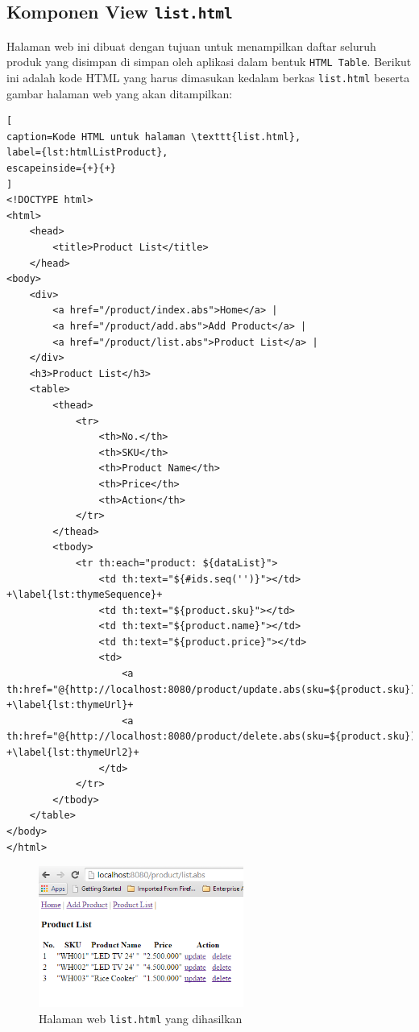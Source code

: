 \subsection{Komponen View \texttt{list.html}}

Halaman web ini dibuat dengan tujuan untuk menampilkan daftar seluruh produk yang disimpan di simpan oleh aplikasi dalam bentuk \texttt{HTML Table}. Berikut ini adalah kode HTML yang harus dimasukan kedalam berkas \texttt{list.html} beserta gambar halaman web yang akan ditampilkan:

\begin{lstlisting}[
caption=Kode HTML untuk halaman \texttt{list.html},
label={lst:htmlListProduct},
escapeinside={+}{+}
]
<!DOCTYPE html>
<html>
	<head>
		<title>Product List</title>
	</head>
<body>
	<div>
		<a href="/product/index.abs">Home</a> |
		<a href="/product/add.abs">Add Product</a> |
		<a href="/product/list.abs">Product List</a> |
	</div>
	<h3>Product List</h3>
	<table>
		<thead>
			<tr>
				<th>No.</th>
				<th>SKU</th>
				<th>Product Name</th>
				<th>Price</th>
				<th>Action</th>
			</tr>
		</thead>
		<tbody>
			<tr th:each="product: ${dataList}">
				<td th:text="${#ids.seq('')}"></td> +\label{lst:thymeSequence}+
				<td th:text="${product.sku}"></td>
				<td th:text="${product.name}"></td>
				<td th:text="${product.price}"></td>
				<td>
					<a th:href="@{http://localhost:8080/product/update.abs(sku=${product.sku})}">update</a>&nbsp;&nbsp; +\label{lst:thymeUrl}+
					<a th:href="@{http://localhost:8080/product/delete.abs(sku=${product.sku})}">delete</a> +\label{lst:thymeUrl2}+
				</td>
			</tr>
		</tbody>
	</table>
</body>
</html>
\end{lstlisting}

\begin{figure}
    \centering
    \includegraphics[width=0.6\textwidth]{img/hasil-list.png}
    \caption{Halaman web \texttt{list.html} yang dihasilkan}
    \label{fig:htmlList}
\end{figure}

